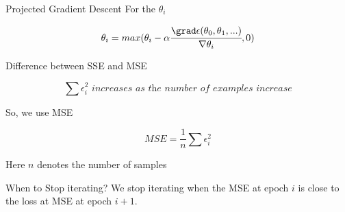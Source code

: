 \documentclass{beamer}
\begin{document}
\begin{frame}{Projected Gradient Descent}
    For the $\theta_{i}$
    
    \begin{equation*}
        \theta_{i} = max(\theta_{i} - \alpha \cfrac{\grad \epsilon (\theta_{0},\theta_{1},...)}{ \nabla  \theta_{i}},0)
    \end{equation*}
\end{frame}

\begin{frame}{Difference between SSE and MSE}
    
    
    
    \begin{equation*}
        \sum \epsilon_{i}^{2} \textit{ increases as the number of examples increase}
    \end{equation*}
    
    So, we use MSE
    
    \begin{equation*}
        \textit{MSE} = \frac{1}{n} \sum \epsilon_{i}^{2}
    \end{equation*}
    
    Here $n$ denotes the number of samples
    
    
    
\end{frame}

\begin{frame}{When to Stop iterating?}
    We stop iterating when the MSE at epoch $i$ is close to the loss at MSE at epoch $i+1$.
\end{frame}
\end{document}
